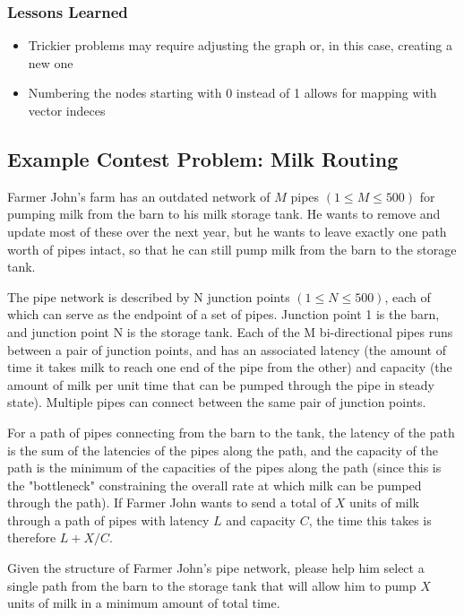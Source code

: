 \subsubsection{Lessons Learned}
\begin{itemize}
	\item Trickier problems may require adjusting the graph or, in this case, creating a new one
	\item Numbering the nodes starting with 0 instead of 1 allows for mapping with vector indeces
\end{itemize}

\subsection{Example Contest Problem: Milk Routing\cite{milkroute}}
Farmer John's farm has an outdated network of $M$ pipes $(1 \leq M \leq 500)$ for pumping milk from the barn to his milk storage tank.  
He wants to remove and update most of these over the next year, but he wants to leave exactly one path worth of pipes intact, 
so that he can still pump milk from the barn to the storage tank.

The pipe network is described by N junction points $(1 \leq N \leq 500)$, each of which can serve as the endpoint of a set of pipes.  
Junction point 1 is the barn, and junction point N is the storage tank.  
Each of the M bi-directional pipes runs between a pair of junction points, and has an associated latency 
(the amount of time it takes milk to reach one end of the pipe from the other) and capacity (the amount of milk per unit time
that can be pumped through the pipe in steady state).  
Multiple pipes can connect between the same pair of junction points.

For a path of pipes connecting from the barn to the tank, the latency of the path is the sum of the latencies of the pipes along 
the path, and the capacity of the path is the minimum of the capacities of the pipes along the path (since this is the "bottleneck" 
constraining the overall rate at which milk can be pumped through the path).  
If Farmer John wants to send a total of $X$ units of milk through a path of pipes with latency $L$ and capacity $C$, the time this takes is therefore $L + X/C$.

Given the structure of Farmer John's pipe network, please help him select a single path from the barn to the storage tank that will allow him to pump $X$ units
of milk in a minimum amount of total time.


